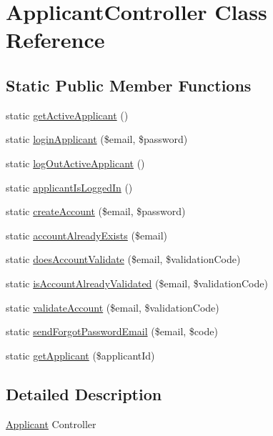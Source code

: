 \hypertarget{class_applicant_controller}{\section{Applicant\-Controller Class Reference}
\label{class_applicant_controller}
}
\subsection*{Static Public Member Functions}
\begin{DoxyCompactItemize}
\item 
static \hyperlink{class_applicant_controller_abc5ca608e524145deb3dde87fed5bb6c}{get\-Active\-Applicant} ()
\item 
static \hyperlink{class_applicant_controller_ad93af1dda3fbe3c02dc863c2102aeec1}{login\-Applicant} (\$email, \$password)
\item 
static \hyperlink{class_applicant_controller_a1087eb4de6fda42adebaaf60330d3074}{log\-Out\-Active\-Applicant} ()
\item 
static \hyperlink{class_applicant_controller_abf63243ec5c49ad4edba2828e58c4508}{applicant\-Is\-Logged\-In} ()
\item 
static \hyperlink{class_applicant_controller_a59bc48304ea67abd8c635209489d6a5b}{create\-Account} (\$email, \$password)
\item 
static \hyperlink{class_applicant_controller_a548e7cb473f9ec0431c449d9cf3f1e6a}{account\-Already\-Exists} (\$email)
\item 
static \hyperlink{class_applicant_controller_ace39e64bd808e83089a356168d1ff561}{does\-Account\-Validate} (\$email, \$validation\-Code)
\item 
static \hyperlink{class_applicant_controller_a1e5b1659a97684285fe0e31e82ebb452}{is\-Account\-Already\-Validated} (\$email, \$validation\-Code)
\item 
static \hyperlink{class_applicant_controller_ac38be01e8044ec57a943ee1d7fb1f7a2}{validate\-Account} (\$email, \$validation\-Code)
\item 
static \hyperlink{class_applicant_controller_ae9768acec8378297aacb8e63f32ee442}{send\-Forgot\-Password\-Email} (\$email, \$code)
\item 
static \hyperlink{class_applicant_controller_aaa30f3b196f0ff83ab42eb847a4ea51d}{get\-Applicant} (\$applicant\-Id)
\end{DoxyCompactItemize}


\subsection{Detailed Description}
\hyperlink{class_applicant}{Applicant} Controller

